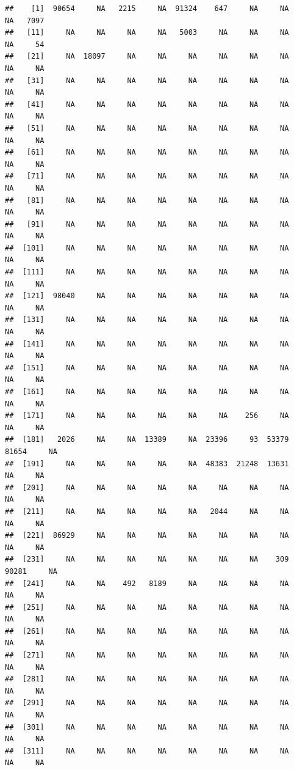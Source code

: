 \documentclass[11pt,a4paper,]{article}
\begin{document}
\begin{verbatim}
##    [1]  90654     NA   2215     NA  91324    647     NA     NA     NA   7097
##   [11]     NA     NA     NA     NA   5003     NA     NA     NA     NA     54
##   [21]     NA  18097     NA     NA     NA     NA     NA     NA     NA     NA
##   [31]     NA     NA     NA     NA     NA     NA     NA     NA     NA     NA
##   [41]     NA     NA     NA     NA     NA     NA     NA     NA     NA     NA
##   [51]     NA     NA     NA     NA     NA     NA     NA     NA     NA     NA
##   [61]     NA     NA     NA     NA     NA     NA     NA     NA     NA     NA
##   [71]     NA     NA     NA     NA     NA     NA     NA     NA     NA     NA
##   [81]     NA     NA     NA     NA     NA     NA     NA     NA     NA     NA
##   [91]     NA     NA     NA     NA     NA     NA     NA     NA     NA     NA
##  [101]     NA     NA     NA     NA     NA     NA     NA     NA     NA     NA
##  [111]     NA     NA     NA     NA     NA     NA     NA     NA     NA     NA
##  [121]  98040     NA     NA     NA     NA     NA     NA     NA     NA     NA
##  [131]     NA     NA     NA     NA     NA     NA     NA     NA     NA     NA
##  [141]     NA     NA     NA     NA     NA     NA     NA     NA     NA     NA
##  [151]     NA     NA     NA     NA     NA     NA     NA     NA     NA     NA
##  [161]     NA     NA     NA     NA     NA     NA     NA     NA     NA     NA
##  [171]     NA     NA     NA     NA     NA     NA    256     NA     NA     NA
##  [181]   2026     NA     NA  13389     NA  23396     93  53379  81654     NA
##  [191]     NA     NA     NA     NA     NA  48383  21248  13631     NA     NA
##  [201]     NA     NA     NA     NA     NA     NA     NA     NA     NA     NA
##  [211]     NA     NA     NA     NA     NA   2044     NA     NA     NA     NA
##  [221]  86929     NA     NA     NA     NA     NA     NA     NA     NA     NA
##  [231]     NA     NA     NA     NA     NA     NA     NA    309  90281     NA
##  [241]     NA     NA    492   8189     NA     NA     NA     NA     NA     NA
##  [251]     NA     NA     NA     NA     NA     NA     NA     NA     NA     NA
##  [261]     NA     NA     NA     NA     NA     NA     NA     NA     NA     NA
##  [271]     NA     NA     NA     NA     NA     NA     NA     NA     NA     NA
##  [281]     NA     NA     NA     NA     NA     NA     NA     NA     NA     NA
##  [291]     NA     NA     NA     NA     NA     NA     NA     NA     NA     NA
##  [301]     NA     NA     NA     NA     NA     NA     NA     NA     NA     NA
##  [311]     NA     NA     NA     NA     NA     NA     NA     NA     NA     NA

\end{verbatim}
\end{document}
